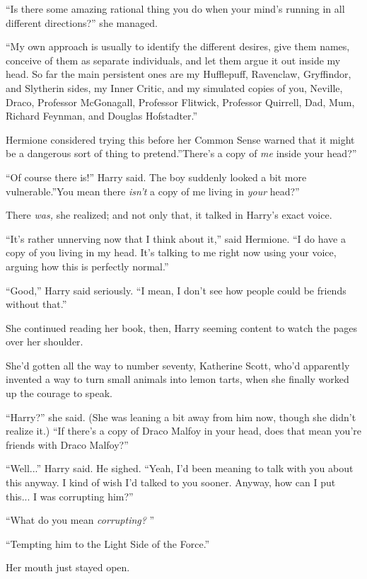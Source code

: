 ``Is there some amazing rational thing you do when your mind's running
in all different directions?'' she managed.

``My own approach is usually to identify the different desires, give
them names, conceive of them as separate individuals, and let them argue
it out inside my head. So far the main persistent ones are my
Hufflepuff, Ravenclaw, Gryffindor, and Slytherin sides, my Inner Critic,
and my simulated copies of you, Neville, Draco, Professor McGonagall,
Professor Flitwick, Professor Quirrell, Dad, Mum, Richard Feynman, and
Douglas Hofstadter.''

Hermione considered trying this before her Common Sense warned that it
might be a dangerous sort of thing to pretend.''There's a copy of
\emph{me} inside your head?''

``Of course there is!'' Harry said. The boy suddenly looked a bit more
vulnerable.''You mean there \emph{isn't} a copy of me living in
\emph{your} head?''

There \emph{was,} she realized; and not only that, it talked in Harry's
exact voice.

``It's rather unnerving now that I think about it,'' said Hermione. ``I
do have a copy of you living in my head. It's talking to me right now
using your voice, arguing how this is perfectly normal.''

``Good,'' Harry said seriously. ``I mean, I don't see how people could
be friends without that.''

She continued reading her book, then, Harry seeming content to watch the
pages over her shoulder.

She'd gotten all the way to number seventy, Katherine Scott, who'd
apparently invented a way to turn small animals into lemon tarts, when
she finally worked up the courage to speak.

``Harry?'' she said. (She was leaning a bit away from him now, though
she didn't realize it.) ``If there's a copy of Draco Malfoy in your
head, does that mean you're friends with Draco Malfoy?''

``Well...'' Harry said. He sighed. ``Yeah, I'd been meaning to talk
with you about this anyway. I kind of wish I'd talked to you sooner.
Anyway, how can I put this... I was corrupting him?''

``What do you mean \emph{corrupting?} ''

``Tempting him to the Light Side of the Force.''

Her mouth just stayed open.

